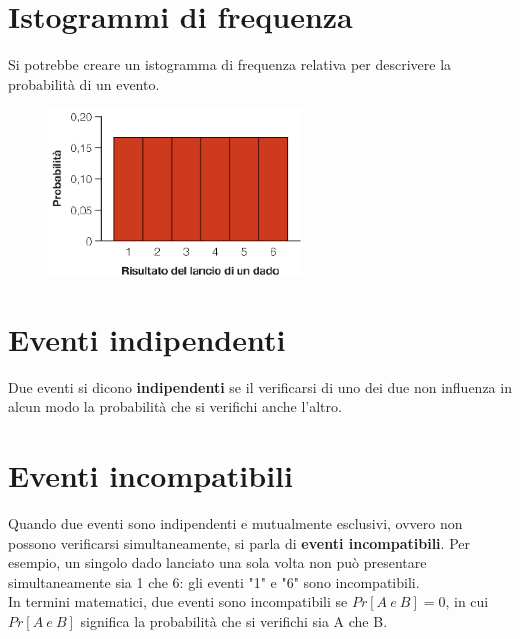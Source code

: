 \documentclass[10pt, draft]{book}
\begin{document}
\section{Istogrammi di frequenza}
Si potrebbe creare un istogramma di frequenza relativa per descrivere la probabilità di un evento.
\begin{figure}[h]\label{fig5.4-1}
    \centering
    \includegraphics[width=0.6\textwidth]{fig5.4-1}
    \caption{\small{}}
\end{figure}

\section{Eventi indipendenti}
Due eventi si dicono \textbf{indipendenti} se il verificarsi di uno dei due non influenza in alcun modo la probabilità che si verifichi anche l'altro.

\section{Eventi incompatibili}
Quando due eventi sono indipendenti e mutualmente esclusivi, ovvero non possono verificarsi simultaneamente, si parla di \textbf{eventi incompatibili}. Per esempio, un singolo dado lanciato una sola volta non può presentare simultaneamente sia 1 che 6: gli eventi "1" e "6" sono incompatibili.
\\
In termini matematici, due eventi sono incompatibili se $Pr[A\ e\ B]=0$, in cui $Pr[A\ e\ B]$ significa la probabilità che si verifichi sia A che B.
\end{document}
